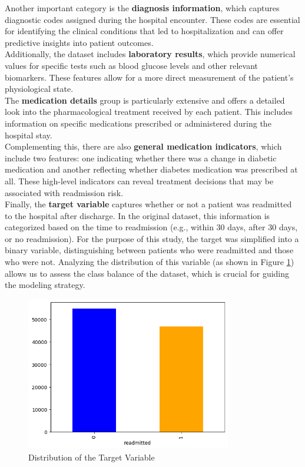 Another important category is the \textbf{diagnosis information}, which captures diagnostic codes assigned during the hospital encounter. These codes are essential for identifying the clinical conditions that led to hospitalization and can offer predictive insights into patient outcomes.\\
Additionally, the dataset includes \textbf{laboratory results}, which provide numerical values for specific tests such as blood glucose levels and other relevant biomarkers. These features allow for a more direct measurement of the patient's physiological state.\\
The \textbf{medication details} group is particularly extensive and offers a detailed look into the pharmacological treatment received by each patient. This includes information on specific medications prescribed or administered during the hospital stay.\\
Complementing this, there are also \textbf{general medication indicators}, which include two features: one indicating whether there was a change in diabetic medication and another reflecting whether diabetes medication was prescribed at all. These high-level indicators can reveal treatment decisions that may be associated with readmission risk.\\
Finally, the \textbf{target variable} captures whether or not a patient was readmitted to the hospital after discharge. In the original dataset, this information is categorized based on the time to readmission (e.g., within 30 days, after 30 days, or no readmission). For the purpose of this study, the target was simplified into a binary variable, distinguishing between patients who were readmitted and those who were not. Analyzing the distribution of this variable (as shown in Figure \ref{fig:target_distribution}) allows us to assess the class balance of the dataset, which is crucial for guiding the modeling strategy.\\




\begin{figure}[H]
    \centering
    \includegraphics[width=0.8\textwidth]{images/balance.png}
    \caption{Distribution of the Target Variable}
    \label{fig:target_distribution}
\end{figure}

